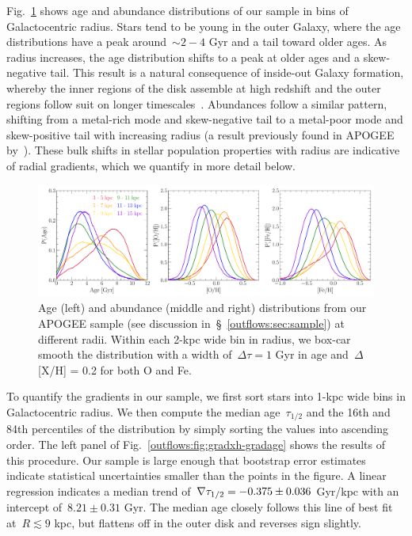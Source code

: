 Fig.~\ref{outflows:fig:age-xh-dists} shows age and abundance distributions of
our sample in bins of Galactocentric radius.
Stars tend to be young in the outer Galaxy, where the age distributions have a
peak around~$\sim$$2-4$ Gyr and a tail toward older ages.
As radius increases, the age distribution shifts to a peak at older ages and a
skew-negative tail.
This result is a natural consequence of inside-out Galaxy formation, whereby
the inner regions of the disk assemble at high redshift and the outer regions
follow suit on longer timescales~\citep[e.g.,][]{White1991, Bird2013}.
Abundances follow a similar pattern, shifting from a metal-rich mode and
skew-negative tail to a metal-poor mode and skew-positive tail with increasing
radius (a result previously found in APOGEE by~\citealt{Hayden2015}).
These bulk shifts in stellar population properties with radius are indicative
of radial gradients, which we quantify in more detail below.

\begin{landscape}
\begin{figure}
\centering
\includegraphics[scale = 0.55]{age_xh_dists.pdf}
\caption{
Age (left) and abundance (middle and right) distributions from our APOGEE
sample (see discussion in~\S~\ref{outflows:sec:sample}) at different
radii.
Within each 2-kpc wide bin in radius, we box-car smooth the distribution with a
width of~$\Delta \tau = 1$ Gyr in age and~$\Delta$[X/H] = 0.2 for both O and
Fe.
}
\label{outflows:fig:age-xh-dists}
\end{figure}
\end{landscape}

To quantify the gradients in our sample, we first sort stars into 1-kpc wide
bins in Galactocentric radius.
We then compute the median age~$\tau_{1/2}$ and the 16th and 84th percentiles
of the distribution by simply sorting the values into ascending order.
The left panel of Fig.~\ref{outflows:fig:gradxh-gradage} shows the results of
this procedure.
Our sample is large enough that bootstrap error estimates indicate statistical
uncertainties smaller than the points in the figure.
A linear regression indicates a median trend of~$\nabla\tau_{1/2} = -0.375 \pm 0.036$
Gyr/kpc with an intercept of~$8.21 \pm 0.31$ Gyr.
The median age closely follows this line of best fit at~$R \lesssim 9$ kpc, but
flattens off in the outer disk and reverses sign slightly.


